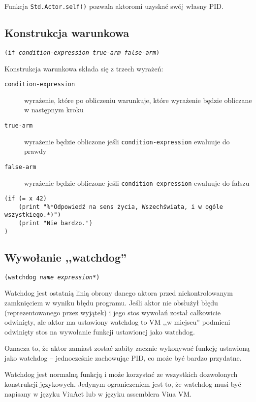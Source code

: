Funkcja \texttt{Std.Actor.self()} pozwala aktoromi uzyskać swój własny PID.

\subsection{Konstrukcja warunkowa}

\texttt{(if \emph{condition-expression} \emph{true-arm} \emph{false-arm})}
\newline

Konstrukcja warunkowa składa się z trzech wyrażeń:

\begin{description}
    \item[\texttt{condition-expression}] wyrażenie, które po obliczeniu warunkuje, które wyrażenie będzie
        obliczane w następnym kroku
    \item[\texttt{true-arm}] wyrażenie będzie obliczone jeśli \texttt{condition-expression} ewaluuje do prawdy
    \item[\texttt{false-arm}] wyrażenie będzie obliczone jeśli \texttt{condition-expression} ewaluuje do
        fałszu
\end{description}

\begin{lstlisting}
(if (= x 42)
    (print "%*Odpowiedź na sens życia, Wszechświata, i w ogóle wszystkiego.*)")
    (print "Nie bardzo.")
)
\end{lstlisting}

\subsection{Wywołanie ,,watchdog''}

\texttt{(watchdog \emph{name} \emph{expression}*)}
\newline

Watchdog jest ostatnią linią obrony danego aktora przed niekontrolowanym zamknięciem w wyniku błędu programu.
Jeśli aktor nie obsłużył błędu (reprezentowanego przez wyjątek) i jego stos wywołań został całkowicie
odwinięty, ale aktor ma ustawiony watchdog to VM ,,w miejscu'' podmieni odwinięty stos na wywołanie funkcji
ustawionej jako watchdog.

Oznacza to, że aktor zamiast zostać zabity zacznie wykonywać funkcję ustawioną jako watchdog -- jednocześnie
zachowując PID, co może być bardzo przydatne.

Watchdog jest normalną funkcją i może korzystać ze wszystkich dozwolonych konstrukcji językowych.
Jedynym ograniczeniem jest to, że watchdog musi być napisany w języku ViuAct lub w języku assemblera Viua VM.

